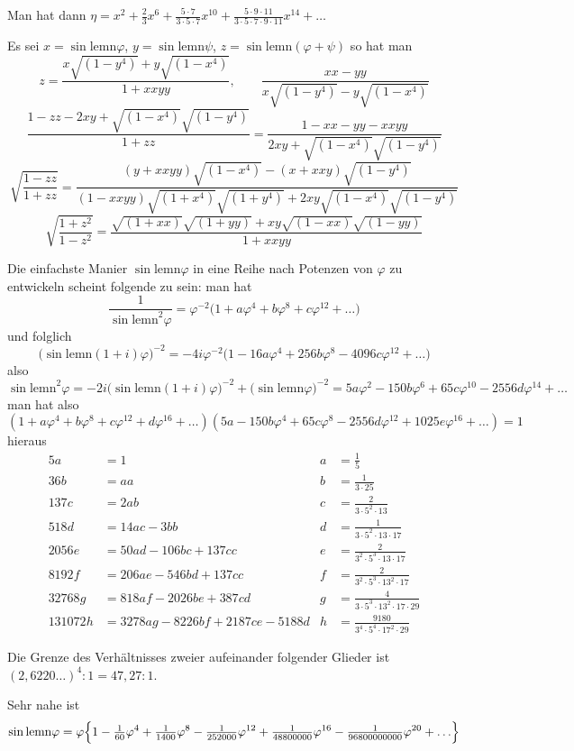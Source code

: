 \documentclass[10pt,a4paper]{article}
\newcommand{\lemn}{\text{lemn}}
\newcommand{\sinlemn}{\sin\lemn}
\begin{document}
Man hat dann $\eta = x^2 + \tfrac{2}{3}x^6 + \tfrac{5\cdot7}{3\cdot5\cdot7}x^{10} + \tfrac{5\cdot9\cdot11}{3\cdot5\cdot7\cdot9\cdot11}x^{14} + \ldots$

Es sei $x=\sinlemn\varphi$, $y=\sinlemn\psi$, $z=\sinlemn(\varphi+\psi)$
so hat man
\[
z = \frac{x\sqrt{(1-y^4)}+y\sqrt{(1-x^4)}}{1+xxyy}, \qquad
\frac{xx-yy}{x\sqrt{(1-y^4)}-y\sqrt{(1-x^4)}}
\]
\[
\frac{1-zz-2xy+\sqrt{(1-x^4)}\sqrt{(1-y^4)}}{1+zz} = \frac{1-xx-yy-xxyy}{2xy+\sqrt{(1-x^4)}\sqrt{(1-y^4)}}
\]
\[
\sqrt{\frac{1-zz}{1+zz}} = \frac{(y+xxyy)\sqrt{(1-x^4)}-(x+xx y)\sqrt{(1-y^4)}}{(1-xxyy)\sqrt{(1+x^4)}\sqrt{(1+y^4)}+2xy\sqrt{(1-x^4)}\sqrt{(1-y^4)}}
\]
\[
\sqrt{\frac{1+z^2}{1-z^2}} = \frac{\sqrt{(1+xx)}\sqrt{(1+yy)}+xy\sqrt{(1-xx)}\sqrt{(1-yy)}}{1+xxyy}
\]

Die einfachste Manier $\sinlemn\varphi$ in eine Reihe nach Potenzen von $\varphi$ zu entwickeln scheint folgende zu sein: man hat
\[
\frac{1}{\sinlemn^2\varphi} = \varphi^{-2}\bigl(1+a\varphi^4+b\varphi^8+c\varphi^{12}+\ldots\bigr)
\]
und folglich
\[
\bigl(\sinlemn(1+i)\varphi\bigr)^{-2} = -4i\varphi^{-2}\bigl(1-16a\varphi^4+256b\varphi^8-4096c\varphi^{12}+\ldots\bigr)
\]
also
\[
\sinlemn^2\varphi = -2i\bigl(\sinlemn(1+i)\varphi\bigr)^{-2} + \bigl(\sinlemn\varphi\bigr)^{-2} = 5a\varphi^2 - 150b\varphi^6 + 65c\varphi^{10} - 2556d\varphi^{14} + \ldots
\]
man hat also
\[
(1+a\varphi^4+b\varphi^8+c\varphi^{12}+d\varphi^{16}+\ldots)(5a-150b\varphi^4+65c\varphi^8-2556d\varphi^{12}+1025e\varphi^{16}+\ldots) = 1
\]
hieraus
\begin{align*}
5a &= 1 & a &= \tfrac{1}{5}\\
36b &= aa & b &= \tfrac{1}{3\cdot25}\\
137c &= 2ab & c &= \tfrac{2}{3\cdot5^2\cdot13}\\
518d &= 14ac-3bb & d &= \tfrac{1}{3\cdot5^2\cdot13\cdot17}\\
2056e &= 50ad-106bc+137cc & e &= \tfrac{2}{3^2\cdot5^3\cdot13\cdot17}\\
8192f &= 206ae-546bd+137cc & f &= \tfrac{2}{3^2\cdot5^3\cdot13^2\cdot17}\\
32768g &= 818af-2026be+387cd & g &= \tfrac{4}{3\cdot5^3\cdot13^2\cdot17\cdot29}\\
131072h &= 3278ag-8226bf+2187ce-5188d & h &= \tfrac{9180}{3^4\cdot5^4\cdot17^2\cdot29}
\end{align*}

Die Grenze des Verhältnisses zweier aufeinander folgender Glieder ist $(2{,}6220\ldots)^4:1 = 47{,}27:1$.

Sehr nahe ist
\[
\sinlemn\varphi = \varphi\Bigl\{1 - \tfrac{1}{60}\varphi^4 + \tfrac{1}{1400}\varphi^8 - \tfrac{1}{252000}\varphi^{12} + \tfrac{1}{48800000}\varphi^{16} - \tfrac{1}{96800000000}\varphi^{20} + \ldots\Bigr\}
\]
\end{document}
